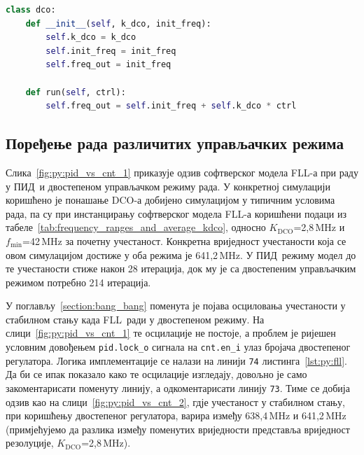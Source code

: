 \documentclass[master]{finthesis}
\newcommand*{\prog}[1]{\texttt{#1}}
\def \FLL  {FLL} %
\def \DCO  {DCO} %
\def \PID  {ПИД} %
\begin{document}
\begin{lstlisting}[language=Python, caption={Имплементација класе дигитално контролисаног осцилатора.}, label={lst:py:dco}]
class dco:
    def __init__(self, k_dco, init_freq):
        self.k_dco = k_dco
        self.init_freq = init_freq
        self.freq_out = init_freq

    def run(self, ctrl):
        self.freq_out = self.init_freq + self.k_dco * ctrl
\end{lstlisting}

\subsection{Поређење рада различитих управљачких режима} \label{section:python_model:pid_vs_cnt}
Слика~\ref{fig:py:pid_vs_cnt_1} приказује одзив софтверског модела \FLL-а при раду у \PID\ и двостепеном управљачком режиму рада. У конкретној симулацији коришћено је понашање \DCO-а добијено симулацијом у типичним условима рада, па су при инстанцирању софтверског модела \FLL-а коришћени подаци из табеле~\ref{tab:frequency_ranges_and_average_kdco}, односно $K_\text{DCO}$=2,8\,MHz и $f_\text{min}$=42\,MHz за почетну учестаност. Конкретна вриједност учестаности која се овом симулацијом достиже у оба режима је 641,2\,MHz. У \PID\ режиму модел до те учестаности стиже након 28 итерација, док му је са двостепеним управљачким режимом потребно 214 итерација. \par 

\vspace{0.5cm}

У поглављу~\ref{section:bang_bang} поменута је појава осциловања учестаности у стабилном стању када \FLL\ ради у двостепеном режиму. На слици~\ref{fig:py:pid_vs_cnt_1} те осцилације не постоје, а проблем је ријешен условним довођењем \prog{pid.lock\_o} сигнала на \prog{cnt.en\_i} улаз бројача двостепеног регулатора. Логика имплементације се налази на линији \prog{74} листинга~\ref{lst:py:fll}. Да би се ипак показало како те осцилације изгледају, довољно је само закоментарисати поменуту линију, а одкоментарисати линију \prog{73}. Тиме се добија одзив као на слици~\ref{fig:py:pid_vs_cnt_2}, гдје учестаност у стабилном стању, при коришћењу двостепеног регулатора, варира између 638,4\,MHz и 641,2\,MHz (примјећујемо да разлика између поменутих вриједности представља вриједност резолуције, $K_\text{DCO}$=2,8\,MHz). \par
\end{document}
